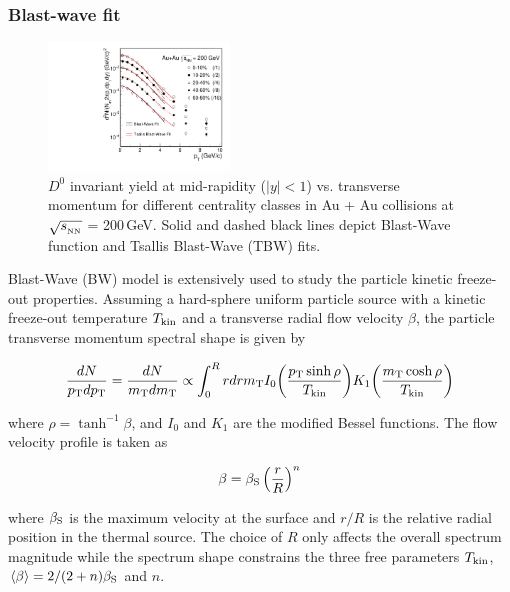 \documentclass[%
 reprint,	
 amsmath,amssymb,
 aps,
 prc,
]{revtex4-1}
\begin{document}
\subsubsection{\label{result:collectivity:BW}Blast-wave fit}

\begin{figure}
\centering
\includegraphics[width=0.43\textwidth]{fig/BWFit.pdf}
\caption{$D^{0}$ invariant yield at mid-rapidity ($|y|<1$) vs. transverse momentum for different centrality classes in Au + Au collisions at $\sqrt{s_{_{\rm NN}}}$ = 200\,GeV. Solid and dashed black lines depict Blast-Wave function and Tsallis Blast-Wave (TBW) fits.}
\label{fig:BWFit} 
\end{figure}

Blast-Wave (BW) model is extensively used to study the particle kinetic freeze-out properties. Assuming a hard-sphere uniform particle source with a kinetic freeze-out temperature $T_{\rm kin}$ and a transverse radial flow velocity $\beta$, the particle transverse momentum spectral shape is given by~\cite{Schnedermann:1993ws}

\begin{widetext}
\[
\frac{dN}{p_{\rm T}dp_{\rm T}} = \frac{dN}{m_{\rm T}dm_{\rm T}} \propto \int_0^R rdr m_{\rm T} I_0\bigg(\frac{p_{\rm T}\sinh\rho}{T_{\rm kin}}\bigg) K_1\bigg(\frac{m_{\rm T}\cosh\rho}{T_{\rm kin}}\bigg)
\]
\end{widetext}
where $\rho = \tanh^{-1}\beta$, and $I_0$ and $K_1$ are the modified Bessel functions. The flow velocity profile is taken as

\[
\beta = \beta_{\rm S}\left(\frac{r}{R}\right)^{n}
\]

where $\beta_{\rm S}$ is the maximum velocity at the surface and $r/R$ is the relative radial position in the thermal source. The choice of $R$ only affects the overall spectrum magnitude while the spectrum shape constrains the three free parameters $T_{\rm kin}$, $\langle\beta\rangle=2/(2+n)\beta_{\rm S}$ and $n$.
\end{document}

